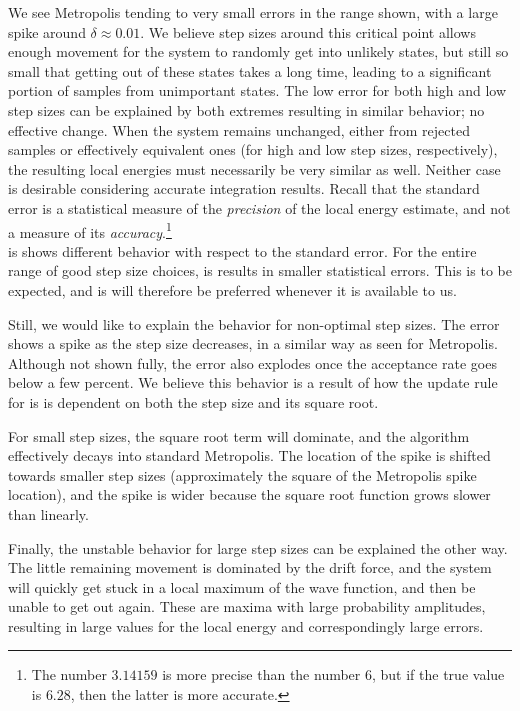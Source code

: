 \documentclass[Thesis.tex]{subfiles}
\begin{document}
We see Metropolis tending to very small errors in the range shown, with a large
spike around $\delta \approx 0.01$. We believe step sizes around this critical
point allows enough movement for the system to randomly get into unlikely
states, but still so small that getting out of these states takes a long time,
leading to a significant portion of samples from unimportant states. The low
error for both high and low step sizes can be explained by both extremes
resulting in similar behavior; no effective change. When the system remains
unchanged, either from rejected samples or effectively equivalent ones (for high
and low step sizes, respectively), the resulting local energies must necessarily
be very similar as well. Neither case is desirable considering accurate
integration results. Recall that the standard error is a statistical measure of
the \emph{precision} of the local energy estimate, and not a measure of its
\emph{accuracy}.\footnote{The number $3.14159$ is more precise than the number
$6$, but if the true value is $6.28$, then the latter is more accurate.}\\

\Gls{is} shows different behavior with respect to the standard error.
For the entire range of good step size choices, \gls{is} results in
smaller statistical errors. This is to be expected, and \gls{is} will
therefore be preferred whenever it is available to us.

Still, we would like to explain the behavior for non-optimal step sizes. The
error shows a spike as the step size decreases, in a similar way as seen for
Metropolis. Although not shown fully, the error also explodes once the
acceptance rate goes below a few percent. We believe this behavior is a result
of how the update rule for \gls{is} is dependent on both the step
size and its square root.

For small step sizes, the square root term will dominate, and the algorithm
effectively decays into standard Metropolis. The location of the spike is
shifted towards smaller step sizes (approximately the square of the Metropolis
spike location), and the spike is wider because the square root function grows
slower than linearly.

Finally, the unstable behavior for large step sizes can be explained the other
way. The little remaining movement is dominated by the drift force, and the
system will quickly get stuck in a local maximum of the wave function, and then be
unable to get out again. These are maxima with large probability amplitudes,
resulting in large values for the local energy and correspondingly large errors.
\end{document}
